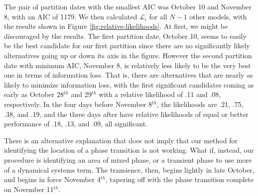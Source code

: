 The pair of partition dates with the smallest AIC was October 10 and
November 8, with an AIC of 1179. We then calculated $\mathcal{L}_i$ for all 
$N-1$ other models, 
with the results shown in Figure \ref{fig:relative-likelihoods}. At first,
we might be discouraged by the results. The first partition date,
October 10, seems to easily be the best candidate for our first partition
since there are no significantly likely alternatives
going up or down its axis in the figure. However the second partition date
with minimum AIC, November 8, is relatively less likely to be the very best one 
in terms of information loss. That is, there are alternatives that are nearly 
as likely to minimize information loss, with the first significant candidates
coming as early as October 28$^{th}$ and 29$^{th}$ with a relative likelihood of 
.11 and .08, respectively. In the four days before November 8$^{th}$, the likelihoods
are .21, .75, .38, and .19, and the three days after have relative likelihoods
of equal or better performance of .18, .13, and .09, all significant. 

There is an alternative explanation that does not imply that our method for
identifying the location of a phase transition is not working. What if,
instead, our procedure is identifying an area of mixed phase, or a transient
phase to use more of a dynamical systems term. The transience, then, begins
lightly in late October, and begins in force November 4$^{th}$, tapering off
with the phase transition complete on November 11$^{th}$. 
